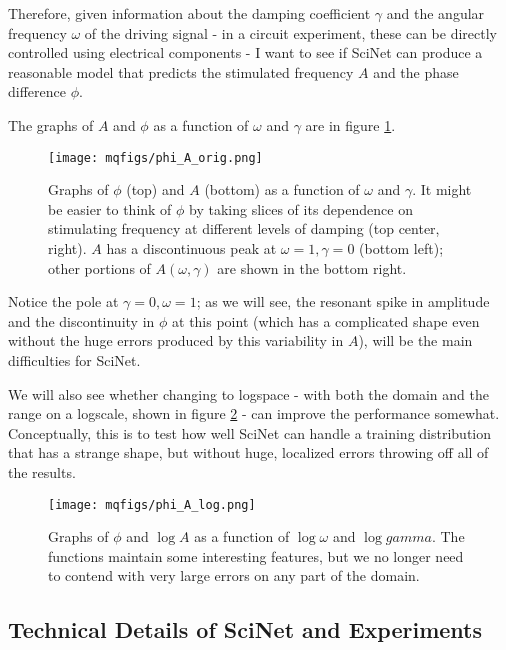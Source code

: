 \documentclass[aps,prl,preprint,groupedaddress]{revtex4-1}
\begin{document}
Therefore, given information about the damping coefficient $\gamma$ and the angular frequency $\omega$ of the driving signal - in a circuit experiment, these can be directly controlled using electrical components - I want to see if SciNet can produce a reasonable model that predicts the stimulated frequency $A$ and the phase difference $\phi$.

The graphs of $A$ and $\phi$ as a function of $\omega$ and $\gamma$ are in figure \ref{groundTruth}. 

\begin{figure}[h]
   \centering
   \texttt{[image: mqfigs/phi\_A\_orig.png]}
   \caption{\label{groundTruth} Graphs of $\phi$ (top) and $A$ (bottom) as a function of $\omega$ and $\gamma$. It might be easier to think of $\phi$ by taking slices of its dependence on stimulating frequency at different levels of damping (top center, right). $A$ has a discontinuous peak at $\omega =1, \gamma = 0$ (bottom left); other portions of $A(\omega, \gamma)$ are shown in the bottom right.}
\end{figure}

Notice the pole at $\gamma = 0, \omega = 1$; as we will see, the resonant spike in amplitude and the discontinuity in $\phi$ at this point (which has a complicated shape even without the huge errors produced by this variability in $A$), will be the main difficulties for SciNet.

We will also see whether changing to logspace - with both the domain and the range on a logscale, shown in figure \ref{logresults} - can improve the performance somewhat. Conceptually, this is to test how well SciNet can handle a training distribution that has a strange shape, but without huge, localized errors throwing off all of the results.

\begin{figure}[h]
   \centering
   \texttt{[image: mqfigs/phi\_A\_log.png]}
   \caption{\label{logresults} Graphs of $\phi$ and $\log A$ as a function of $\log \omega$ and $\log gamma$. The functions maintain some interesting features, but we no longer need to contend with very large errors on any part of the domain.}
\end{figure}

\subsection{ Technical Details of SciNet and Experiments}
\end{document}
